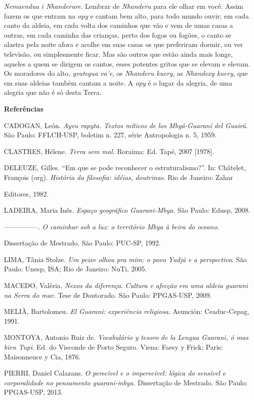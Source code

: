 \emph{Nemaendua i Nhanderure}. Lembrar de \emph{Nhanderu} para ele olhar
em você. Assim fazem os que entram na \emph{opy} e cantam bem alto, para
todo mundo ouvir; em cada canto da aldeia, em cada volta dos caminhos
que vão e vem de umas casas a outras, em cada caminha das crianças,
perto dos fogos ou fogões, o canto se alastra pela noite afora e acolhe
em suas casas os que preferiram dormir, ou ver televisão, ou
simplesmente ficar. Mas são outros que estão ainda mais longe, aqueles a
quem se dirigem os cantos, esses potentes gritos que se elevam e elevam.
Os moradores do alto, \emph{yvategua va'e}, os \emph{Nhanderu kuery}, as
\emph{Nhandexy kuery}, que em suas aldeias também cantam a noite. A
\emph{opy} é o lugar da alegria, de uma alegria que não é só desta
Terra.

\textbf{Referências}

CADOGAN, León. \emph{Ayvu rapyta. Textos míticos de los Mbyá-Guaraní del
Guairá}. São Paulo: FFLCH-USP, boletim n. 227, série Antropologia n. 5,
1959.

CLASTRES, Hélene. \emph{Terra sem mal.} Roraima: Ed. Tapé, 2007
{[}1978{]}.

DELEUZE, Gilles. ``Em que se pode reconhecer o estruturalismo?''. In:
Châtelet, François (org). \emph{História da filosofia: idéias,
doutrinas}. Rio de Janeiro: Zahar

Editores, 1982.

LADEIRA, Maria Inês. \emph{Espaço geográfico Guarani-Mbya.} São Paulo:
Edusp, 2008.

---------------. \emph{O caminhar sob a luz: o território Mbya à beira
do oceano}.

Dissertação de Mestrado. São Paulo: PUC-SP, 1992.

LIMA, Tânia Stolze. \emph{Um peixe olhou pra mim: o povo Yudjá e a
perspectiva}. São Paulo: Unesp, ISA; Rio de Janeiro: NuTi, 2005.

MACEDO, Valéria. \emph{Nexos da diferença}. \emph{Cultura e afecção em
uma aldeia guarani na Serra do mar.} Tese de Doutorado. São Paulo:
PPGAS-USP, 2009.

MELIÀ, Bartolomeu. \emph{El Guarani: experiência religiosa}. Asunción:
Ceaduc-Cepag, 1991.

MONTOYA, Antonio Ruiz de. \emph{Vocabulário y tesoro de la Lengua
Guarani, ó mas bien Tupi}. Ed. do Visconde de Porto Seguro. Viena: Faesy
y Frick; Paris: Maisonneuce y Cia, 1876.

PIERRI, Daniel Calazans. \emph{O perecível e o imperecível: lógica do
sensível e corporalidade no pensamento guarani-mbya.} Dissertação de
Mestrado. São Paulo: PPGAS-USP, 2013.


